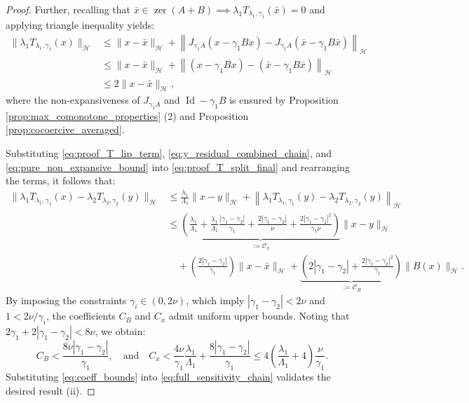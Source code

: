 \documentclass{article}
\theoremstyle{definition}
\theoremstyle{definition}
\theoremstyle{definition}
\begin{document}
\begin{proof}
\noindent Further, recalling that $\bar{x} \in \operatorname{zer}(A+B) \implies \lambda_1 T_{\lambda_1, \gamma_1}(\bar{x}) = 0$ and applying triangle inequality yields:
\begin{align}
\|\lambda_1 T_{\lambda_1, \gamma_1}(x)\|_{\mathcal{H}} 
&\le \| x - \bar{x} \|_{\mathcal{H}} + \left\| J_{\gamma_1 A} \left( x - \gamma_1 Bx \right) - J_{\gamma_1 A} \left( \bar{x} - \gamma_1 B\bar{x} \right) \right\|_{\mathcal{H}} \nonumber \\
&\le \| x - \bar{x} \|_{\mathcal{H}} + \left\| \left( x - \gamma_1 Bx \right) - \left( \bar{x} - \gamma_1 B\bar{x} \right) \right\|_{\mathcal{H}} \nonumber \\
&\le 2 \| x - \bar{x} \|_{\mathcal{H}}, \label{eq:pure_non_expansive_bound}
\end{align}
where the non-expansiveness of $J_{\gamma_1 A}$ and $\operatorname{Id} - \gamma_1 B$ is ensured by Proposition \ref{prop:max_comonotone_properties} (2) and Proposition \ref{prop:cocoercive_averaged}.

\noindent Substituting \eqref{eq:proof_T_lip_term}, \eqref{eq:y_residual_combined_chain}, and \eqref{eq:pure_non_expansive_bound} into \eqref{eq:proof_T_split_final} and rearranging the terms, it follows that:
\begin{align}
\|\lambda_{1} T_{\lambda_{1}, \gamma_{1}}(x) - \lambda_{2} T_{\lambda_{2}, \gamma_{2}}(y)\|_{\mathcal{H}} &\le \frac{\lambda_1}{\Lambda_1} \|x - y\|_{\mathcal{H}} + \left\| \lambda_{1} T_{\lambda_{1}, \gamma_{1}}(y) - \lambda_{2} T_{\lambda_{2}, \gamma_{2}}(y) \right\|_{\mathcal{H}} \nonumber \\
&\le \underbrace{\left( \frac{\lambda_1}{\Lambda_1} + \frac{\lambda_1}{\Lambda_1} \frac{|\gamma_1 - \gamma_2|}{\gamma_1} + \frac{2|\gamma_1 - \gamma_2|}{\nu} + \frac{2|\gamma_1 - \gamma_2|^2}{\gamma_1 \nu} \right)}_{:= \mathcal{C}_x} \|x - y\|_{\mathcal{H}} \nonumber \\
&\quad + \left( \frac{2 |\gamma_1 - \gamma_2|}{\gamma_1} \right) \|x - \bar{x}\|_{\mathcal{H}} + \underbrace{\left( 2|\gamma_1 - \gamma_2| + \frac{2 |\gamma_1 - \gamma_2|^2}{\gamma_1} \right)}_{:= \mathcal{C}_B} \|B(x)\|_{\mathcal{H}}. \label{eq:full_sensitivity_chain}
\end{align}
By imposing the constraints $\gamma_{i} \in (0, 2\nu)$, which imply $|\gamma_{1} - \gamma_{2}| < 2\nu$ and $1 < 2\nu/\gamma_{i}$, the coefficients $C_{B}$ and $C_{x}$ admit uniform upper bounds. Noting that $2\gamma_1 + 2|\gamma_1 - \gamma_2| < 8\nu$, we obtain:
\begin{equation}\label{eq:coeff_bounds}
C_{B} < \frac{8\nu |\gamma_{1} - \gamma_{2}|}{\gamma_{1}}, \quad \text{and} \quad C_{x} < \frac{4\nu}{\gamma_{1}} \frac{\lambda_{1}}{\Lambda_{1}} + \frac{8 |\gamma_{1} - \gamma_{2}|}{\gamma_{1}} \le 4 \left( \frac{\lambda_{1}}{\Lambda_{1}} + 4 \right) \frac{\nu}{\gamma_{1}}.
\end{equation}
Substituting \eqref{eq:coeff_bounds} into \eqref{eq:full_sensitivity_chain} validates the desired result (ii).


\end{proof}
\end{document}
